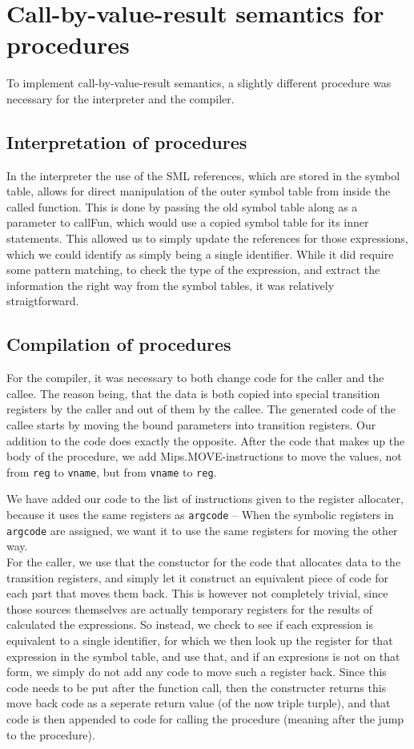 \documentclass{article}
\begin{document}
\section{Call-by-value-result semantics for procedures}
To implement call-by-value-result semantics, a slightly different procedure was necessary
for the interpreter and the compiler. 

\subsection{Interpretation of procedures}
In the interpreter the use of the SML references,
which are stored in the symbol table, allows for direct manipulation of the outer symbol table from inside the called function.
This is done by passing the old symbol table along as a parameter to callFun, which would use a copied symbol table for its inner statements.
This allowed us to simply update the references for those expressions, which we could identify as simply being a single identifier.
While it did require some pattern matching, to check the type of the expression, and extract the information the right way
from the symbol tables, it was relatively straigtforward.
\subsection{Compilation of procedures}
For the compiler, it was necessary to both change code for the caller and the callee.
The reason being, that the data is both copied into special transition registers by the caller and out of them by the callee.
The generated code of the callee starts by moving the bound parameters into transition registers. Our addition to the code
does exactly the opposite. After the code that makes up the body of the procedure, we add Mips.MOVE-instructions
to move the values, not from \texttt{reg} to \texttt{vname}, but from \texttt{vname} to \texttt{reg}.

We have added our code to the list of instructions given to the register allocater, because it uses the same
registers as \texttt{argcode} -- When the symbolic registers in \texttt{argcode} are assigned, we want it to
use the same registers for moving the other way.
\\
For the caller, we use that the constuctor for the code that allocates data to the transition registers,
and simply let it construct an equivalent piece of code for each part that moves them back.
This is however not completely trivial, since those sources themselves are actually temporary registers
for the results of calculated the expressions. So instead, we check to see if each expression is equivalent
to a single identifier, for which we then look up the register for that expression in the symbol table,
and use that, and if an expresions is not on that form, we simply do not add any code to move such a register back.
Since this code needs to be put after the function call, then the constructer returns this move back code as a seperate
return value (of the now triple turple), and that code is then appended to code for calling the procedure
(meaning after the jump to the procedure).
\end{document}
